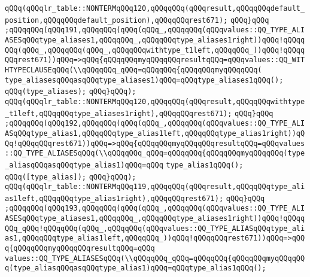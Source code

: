 \verb|qQQq(qQQqlr_table::NONTERMqQQq120,qQQqqQQq(qQQqresult,qQQqqQQqdefault_position,qQQqqQQqdefault_position),qQQqqQQqrest671);|\newline
\verb|qQQq}qQQq|\newline
\verb|;qQQqqQQq(qQQq191,qQQqqQQq(qQQq(qQQq_,qQQqqQQq(qQQqvalues::QQ_TYPE_ALIASESqQQqtype_aliases1,qQQqqQQq_,qQQqqQQqtype_aliases1right))qQQq!qQQqqQQq(qQQq_,qQQqqQQq(qQQq_,qQQqqQQqwithtype_t1left,qQQqqQQq_))qQQq!qQQqqQQqrest671))qQQq=>qQQq{qQQqqQQqmyqQQqqQQqresultqQQq=qQQqvalues::QQ_WITHTYPECLAUSEqQQq(\\qQQqqQQq_qQQq=qQQqqQQq{qQQqqQQqmyqQQqqQQq(|\newline
\verb|type_aliasesqQQqasqQQqtype_aliases1)qQQq=qQQqtype_aliases1qQQq();|\newline
\verb|qQQq(type_aliases);|\newline
\verb|qQQq}qQQq);|\newline
\verb|qQQq(qQQqlr_table::NONTERMqQQq120,qQQqqQQq(qQQqresult,qQQqqQQqwithtype_t1left,qQQqqQQqtype_aliases1right),qQQqqQQqrest671);|\newline
\verb|qQQq}qQQq|\newline
\verb|;qQQqqQQq(qQQq192,qQQqqQQq(qQQq(qQQq_,qQQqqQQq(qQQqvalues::QQ_TYPE_ALIASqQQqtype_alias1,qQQqqQQqtype_alias1left,qQQqqQQqtype_alias1right))qQQq!qQQqqQQqrest671))qQQq=>qQQq{qQQqqQQqmyqQQqqQQqresultqQQq=qQQqvalues::QQ_TYPE_ALIASESqQQq(\\qQQqqQQq_qQQq=qQQqqQQq{qQQqqQQqmyqQQqqQQq(type_aliasqQQqasqQQqtype_alias1)qQQq=qQQq|\newline
\verb|type_alias1qQQq();|\newline
\verb|qQQq([type_alias]);|\newline
\verb|qQQq}qQQq);|\newline
\verb|qQQq(qQQqlr_table::NONTERMqQQq119,qQQqqQQq(qQQqresult,qQQqqQQqtype_alias1left,qQQqqQQqtype_alias1right),qQQqqQQqrest671);|\newline
\verb|qQQq}qQQq|\newline
\verb|;qQQqqQQq(qQQq193,qQQqqQQq(qQQq(qQQq_,qQQqqQQq(qQQqvalues::QQ_TYPE_ALIASESqQQqtype_aliases1,qQQqqQQq_,qQQqqQQqtype_aliases1right))qQQq!qQQqqQQq_qQQq!qQQqqQQq(qQQq_,qQQqqQQq(qQQqvalues::QQ_TYPE_ALIASqQQqtype_alias1,qQQqqQQqtype_alias1left,qQQqqQQq_))qQQq!qQQqqQQqrest671))qQQq=>qQQq{qQQqqQQqmyqQQqqQQqresultqQQq=qQQq|\newline
\verb|values::QQ_TYPE_ALIASESqQQq(\\qQQqqQQq_qQQq=qQQqqQQq{qQQqqQQqmyqQQqqQQq(type_aliasqQQqasqQQqtype_alias1)qQQq=qQQqtype_alias1qQQq();|\newline
